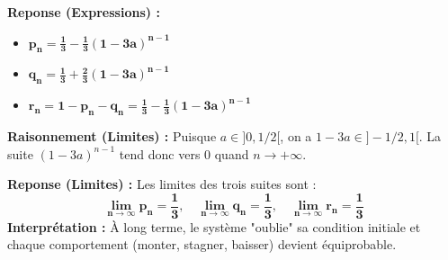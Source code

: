 \documentclass[11pt,a4paper]{article}
\begin{document}
\textbf{Reponse (Expressions) :}
\begin{itemize}
    \item $\mathbf{p_n = \frac{1}{3} - \frac{1}{3}(1-3a)^{n-1}}$
    \item $\mathbf{q_n = \frac{1}{3} + \frac{2}{3}(1-3a)^{n-1}}$
    \item $\mathbf{r_n = 1 - p_n - q_n = \frac{1}{3} - \frac{1}{3}(1-3a)^{n-1}}$
\end{itemize}

\textbf{Raisonnement (Limites) :} Puisque $a \in ]0, 1/2[$, on a $1-3a \in ]-1/2, 1[$. La suite $(1-3a)^{n-1}$ tend donc vers 0 quand $n \to +\infty$.

\textbf{Reponse (Limites) :}
Les limites des trois suites sont :
$$ \mathbf{\lim_{n \to \infty} p_n = \frac{1}{3}, \quad \lim_{n \to \infty} q_n = \frac{1}{3}, \quad \lim_{n \to \infty} r_n = \frac{1}{3}} $$
\textbf{Interprétation :} À long terme, le système "oublie" sa condition initiale et chaque comportement (monter, stagner, baisser) devient équiprobable.
\end{document}

